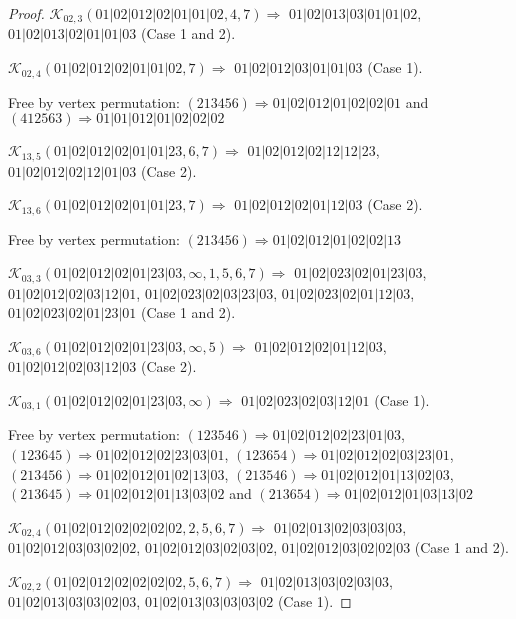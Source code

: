 \documentclass[12pt]{article}
\theoremstyle{plain}
\theoremstyle{definition}
\theoremstyle{remark}
\newcommand{\fancy}[1]{\mathcal{#1}}
\def\K{\fancy{K}}
\begin{document}
\begin{proof}
	\bigskip
	
	$\K_{02,3}(01|02|012|02|01|01|02,4, 7)\Rightarrow $ $01|02|013|03|01|01|02$, $01|02|013|02|01|01|03$ (Case 1 and 2).
	
	$\K_{02,4}(01|02|012|02|01|01|02,7)\Rightarrow $ $01|02|012|03|01|01|03$ (Case 1).
	
	
	
	Free by vertex permutation: $(2 1 3 4 5 6)\Rightarrow 01|02|012|01|02|02|01$ and $(4 1 2 5 6 3)\Rightarrow 01|01|012|01|02|02|02$
	
	
	
	\bigskip
	
	$\K_{13,5}(01|02|012|02|01|01|23,6, 7)\Rightarrow $ $01|02|012|02|12|12|23$, $01|02|012|02|12|01|03$ (Case 2).
	
	$\K_{13,6}(01|02|012|02|01|01|23,7)\Rightarrow $ $01|02|012|02|01|12|03$ (Case 2).
	
	
	
	Free by vertex permutation: $(2 1 3 4 5 6)\Rightarrow 01|02|012|01|02|02|13$
	
	
	
	\bigskip
	
	$\K_{03,3}(01|02|012|02|01|23|03,\infty,1, 5, 6, 7)\Rightarrow $ $01|02|023|02|01|23|03$, $01|02|012|02|03|12|01$, $01|02|023|02|03|23|03$, $01|02|023|02|01|12|03$, $01|02|023|02|01|23|01$ (Case 1 and 2).
	
	$\K_{03,6}(01|02|012|02|01|23|03,\infty,5)\Rightarrow $ $01|02|012|02|01|12|03$, $01|02|012|02|03|12|03$ (Case 2).
	
	$\K_{03,1}(01|02|012|02|01|23|03,\infty)\Rightarrow $ $01|02|023|02|03|12|01$ (Case 1).
	
	
	
	Free by vertex permutation: $(1 2 3 5 4 6)\Rightarrow 01|02|012|02|23|01|03$, $(1 2 3 6 4 5)\Rightarrow 01|02|012|02|23|03|01$, $(1 2 3 6 5 4)\Rightarrow 01|02|012|02|03|23|01$, $(2 1 3 4 5 6)\Rightarrow 01|02|012|01|02|13|03$, $(2 1 3 5 4 6)\Rightarrow 01|02|012|01|13|02|03$, $(2 1 3 6 4 5)\Rightarrow 01|02|012|01|13|03|02$ and $(2 1 3 6 5 4)\Rightarrow 01|02|012|01|03|13|02$
	
	
	
	\bigskip
	
	$\K_{02,4}(01|02|012|02|02|02|02,2, 5, 6, 7)\Rightarrow $ $01|02|013|02|03|03|03$, $01|02|012|03|03|02|02$, $01|02|012|03|02|03|02$, $01|02|012|03|02|02|03$ (Case 1 and 2).
	
	$\K_{02,2}(01|02|012|02|02|02|02,5, 6, 7)\Rightarrow $ $01|02|013|03|02|03|03$, $01|02|013|03|03|02|03$, $01|02|013|03|03|03|02$ (Case 1).
	

\end{proof}
\end{document}
